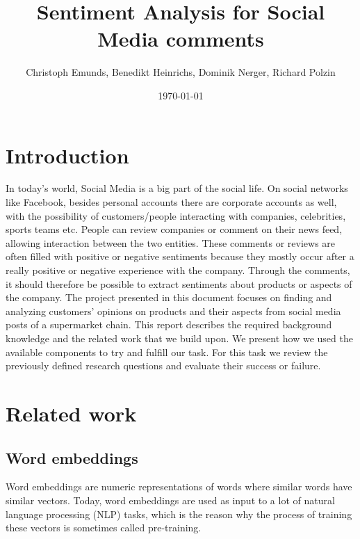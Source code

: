 \documentclass[10pt,a4paper]{article}
\title{{\Huge Sentiment Analysis for Social Media comments}}
\author{Christoph Emunds, Benedikt Heinrichs, Dominik Nerger, Richard Polzin}
\date{\today}
\begin{document}
	\maketitle
	
	\begin{abstract}
		
	\end{abstract}
	
	\tableofcontents
	
	\section{Introduction}
	In today's world, Social Media is a big part of the social life. On social networks like Facebook, besides personal accounts there are corporate accounts as well, with the possibility of customers/people interacting with companies, celebrities, sports teams etc.
	People can review companies or comment on their news feed, allowing interaction between the two entities. These comments or reviews are often filled with positive or negative sentiments because they mostly occur after a really positive or negative experience with the company. Through the comments, it should therefore be possible to extract sentiments about products or aspects of the company.
	The project presented in this document focuses on finding and analyzing customers' opinions on products and their aspects from social media posts of a supermarket chain. This report describes the required background knowledge and the related work that we build upon. We present how we used the available components to try and fulfill our task. For this task we review the previously defined research questions and evaluate their success or failure.
	
	\section{Related work}
	
		\subsection{Word embeddings}
		Word embeddings are numeric representations of words where similar words have similar vectors. Today, word embeddings are used as input to a lot of natural language processing (NLP) tasks, which is the reason why the process of training these vectors is sometimes called pre-training.
		
\end{document}
